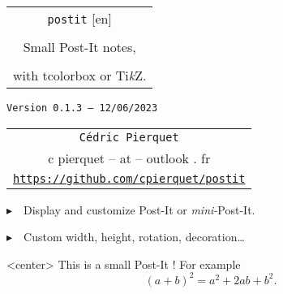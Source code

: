 \documentclass[english,a4paper,11pt]{article}
\def\TPversion{0.1.3}
\def\TPdate{12/06/2023}
\begin{document}
\setlength{\aweboxleftmargin}{0.07\linewidth}
\setlength{\aweboxcontentwidth}{0.93\linewidth}
\setlength{\aweboxvskip}{8pt}

\pagestyle{fancy}

\thispagestyle{empty}

\vspace{2cm}

\begin{center}
	\begin{minipage}{0.75\linewidth}
	\begin{tcolorbox}[colframe=yellow,colback=yellow!15]
		\begin{center}
			\begin{tabular}{c}
				{\Huge \texttt{postit} [en]}\\
				\\
				{\LARGE Small Post-It notes,} \\
				\\
				{\LARGE with \textsf{tcolorbox} or \textsf{Ti\textit{k}Z}.} \\
			\end{tabular}
			
			\bigskip
			
			{\small \texttt{Version \TPversion{} -- \TPdate}}
		\end{center}
	\end{tcolorbox}
\end{minipage}
\end{center}

\begin{center}
	\begin{tabular}{c}
	\texttt{Cédric Pierquet}\\
	{\ttfamily c pierquet -- at -- outlook . fr}\\
	\texttt{\url{https://github.com/cpierquet/postit}}
\end{tabular}
\end{center}

\vspace{0.25cm}

{$\blacktriangleright$~~Display and customize Post-It or \textit{mini-}Post-It.}

\vspace{0.25cm}

{$\blacktriangleright$~~Custom width, height, rotation, decoration\ldots}

\vspace{1cm}

\begin{PostItNote}[StorePostIt=PI1]<center>
	This is a small Post-It ! For example \[(a+b)^2=a^2+2ab+b^2.\]
\end{PostItNote}
\end{document}

